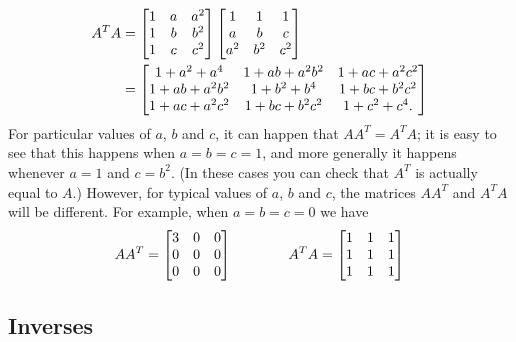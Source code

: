\documentclass[a4paper]{book}
\theoremstyle{definition}
\renewenvironment{solution}{\SolutionInline}{\endSolutionInline}
\begin{document}
\begin{solution}
\begin{itemize}
\begin{align*}
    A^TA &=
          \begin{bmatrix}
            1 & a & a^2 \\
            1 & b & b^2 \\
            1 & c & c^2
          \end{bmatrix}
          \begin{bmatrix}
            1   & 1   & 1   \\
            a   & b   & c   \\
            a^2 & b^2 & c^2
          \end{bmatrix} \\
         &=
          \begin{bmatrix}
           1 + a^2 + a^4   & 1 + ab + a^2b^2 & 1 + ac + a^2c^2 \\
           1 + ab + a^2b^2 & 1 + b^2 + b^4   & 1 + bc + b^2c^2 \\
           1 + ac + a^2c^2 & 1 + bc + b^2c^2 & 1 + c^2 + c^4.
          \end{bmatrix}
   \end{align*}
   For particular values of $a$, $b$ and $c$, it can happen that
   $AA^T=A^TA$; it is easy to see that this happens when $a=b=c=1$,
   and more generally it happens whenever $a=1$ and $c=b^2$.  (In
   these cases you can check that $A^T$ is actually equal to $A$.)
   However, for typical values of $a$, $b$ and $c$, the matrices
   $AA^T$ and $A^TA$ will be different.  For example, when $a=b=c=0$
   we have
   \[ AA^T = \begin{bmatrix}
              3 & 0 & 0 \\
              0 & 0 & 0 \\
              0 & 0 & 0
             \end{bmatrix} \hspace{4em}
      A^TA = \begin{bmatrix}
              1 & 1 & 1 \\
              1 & 1 & 1 \\
              1 & 1 & 1
             \end{bmatrix}
   \]
 \end{itemize}
\end{solution}


\subsection{Inverses}
\label{subsec-mat-inv}
\end{document}

